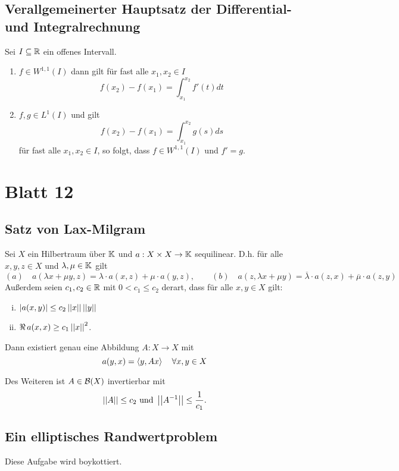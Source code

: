 \documentclass[FunkAnaskriptSS2017.tex]{subfiles}
\begin{document}
\subsection{ Verallgemeinerter Hauptsatz der Differential- und Integralrechnung}
\label{B11.3}
	Sei $I\subseteq \mathbb{R}$ ein offenes Intervall.
	\begin{enumerate}
		\item $f \in W^{1,1}(I)$ dann gilt für fast alle $x_1, x_2 \in I$ 
		$$f(x_2) - f(x_1) = \int^{x_2}_{x_1} f'(t) dt$$
		\item $f,g \in L^1(I)$ und  gilt
		$$f(x_2) - f(x_1) = \int^{x_2}_{x_1} g(s) ds$$
		für fast alle $x_1,x_2 \in I$, so folgt, dass $f \in W^{1,1}(I)$ und $f' = g$.
	\end{enumerate}


\newpage 
\section{ Blatt 12}


\subsection{ Satz von Lax-Milgram}
\label{B12.1}
	Sei $X$ ein Hilbertraum über $\mathbb{K}$ und $a : X \times X \to \mathbb{K}$ sequilinear. D.h. für alle $x,y,z \in X$ und $\lambda,\mu \in\mathbb{K}$ gilt
	 $$ (a)\quad a(\lambda x + \mu y ,z) = \lambda \cdot a(x,z) + \mu \cdot a(y,z),\qquad
		(b)\quad a(z, \lambda x + \mu y ) = \overline{\lambda} \cdot a(z,x) + \overline{\mu} \cdot a(z,y)$$
	Außerdem seien $c_1, c_2 \in \mathbb{R}$ mit $0< c_1 \leq c_2$ derart, dass für alle $x,y \in X$ gilt:
	\begin{enumerate}[(i)]
	\item $\left\lvert a(x,y) \right\rvert \leq c_2 \left\lvert \left\lvert x \right\rvert \right\rvert \left\lvert \left\lvert y \right\rvert \right\rvert$
	\item $\Re \, a(x,x) \geq c_1 \left\lvert \left\lvert x \right\rvert \right\rvert^2$.
	\end{enumerate}
	
	Dann existiert genau eine Abbildung $A: X\to X$ mit
	$$a(y,x) = \left \langle y,Ax \right \rangle \quad \forall x,y \in X$$
	
	Des Weiteren ist $A \in \mathcal{B}(X)$ invertierbar mit
	$$\left\lvert \left\lvert A \right\rvert \right\rvert \leq c_2 \text{ und } \left\lvert \left\lvert A^{-1} \right\rvert \right\rvert \leq \frac{1}{c_1}.$$	 
	
	

\subsection{ Ein elliptisches Randwertproblem}
\label{B12.2}
	Diese Aufgabe wird boykottiert.
	
\end{document}
